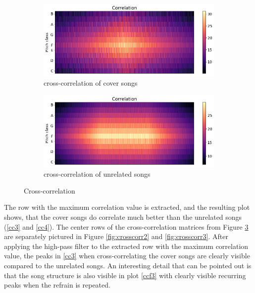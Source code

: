\begin{figure}[htbp]
{{			\begin{subfigure}{.495\textwidth}
				\centering    
				\includegraphics[scale=0.3]{Images/Chroma/cross_hurricane.png}
				\caption{cross-correlation of cover songs}
				\label{cc1}
			\end{subfigure}		
			\begin{subfigure}{.495\textwidth}
				\centering     
				\includegraphics[scale=0.3]{Images/Chroma/cross_hurricane_sia.png}
				\caption{cross-correlation of unrelated songs}
				\label{cc2}
			\end{subfigure}%
	}}
	\caption{Cross-correlation}
	\label{fig:crosscorr}
\end{figure}
The row with the maximum correlation value is extracted, and the resulting plot shows, that the cover songs do correlate much better than the unrelated songs (\ref{cc3} and \ref{cc4}).
The center rows of the cross-correlation matrices from Figure \ref{fig:crosscorr} are separately pictured in Figure \ref{fig:crosscorr2} and \ref{fig:crosscorr3}. After applying the high-pass filter to the extracted row with the maximum correlation value, the peaks in \ref{cc3} when cross-correlating the cover songs are clearly visible compared to the unrelated songs. An interesting detail that can be pointed out is that the song structure is also visible in plot \ref{ccf3} with clearly visible recurring peaks when the refrain is repeated.
